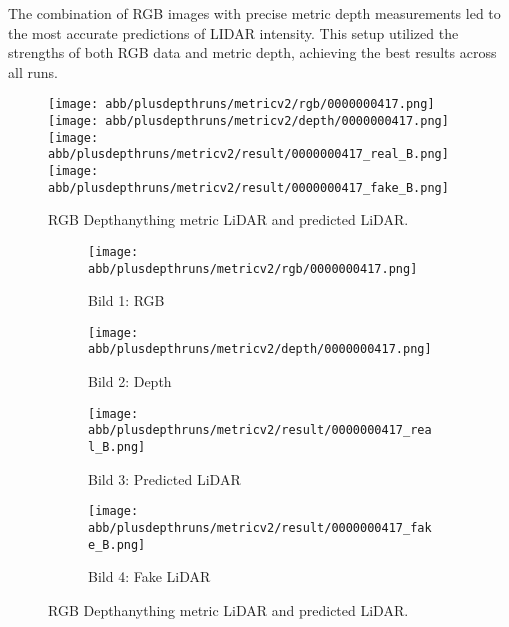 The combination of RGB images with precise metric depth measurements led to the most accurate predictions of LIDAR intensity. This setup utilized the strengths of both RGB data and metric depth, achieving the best results across all runs.
\begin{figure}[!ht]
	\centering
	\texttt{[image: abb/plusdepthruns/metricv2/rgb/0000000417.png]}
	\texttt{[image: abb/plusdepthruns/metricv2/depth/0000000417.png]}
	\texttt{[image: abb/plusdepthruns/metricv2/result/0000000417\_real\_B.png]}
	\texttt{[image: abb/plusdepthruns/metricv2/result/0000000417\_fake\_B.png]}
	\caption{RGB Depthanything metric LiDAR and predicted LiDAR.}
	\label{bpplusv2}
	
\end{figure}
\begin{figure}[!ht]
	\centering
	
	\begin{subfigure}{0.4\textwidth}
		\centering
		\texttt{[image: abb/plusdepthruns/metricv2/rgb/0000000417.png]}
		\caption{Bild 1: RGB}
		\label{fig:bild1}
	\end{subfigure}
	
	\vspace{1em} %
	
	\begin{subfigure}{0.4\textwidth}
		\centering
		\texttt{[image: abb/plusdepthruns/metricv2/depth/0000000417.png]}
		\caption{Bild 2: Depth}
		\label{fig:bild2}
	\end{subfigure}
	
	\vspace{1em} %
	
	\begin{subfigure}{0.25\textwidth}
		\centering
		\texttt{[image: abb/plusdepthruns/metricv2/result/0000000417\_real\_B.png]}
		\caption{Bild 3: Predicted LiDAR}
		\label{fig:bild3}
	\end{subfigure}
	\begin{subfigure}{0.25\textwidth}
		\centering
		\texttt{[image: abb/plusdepthruns/metricv2/result/0000000417\_fake\_B.png]}
		\caption{Bild 4: Fake LiDAR}
		\label{fig:bild4}
	\end{subfigure}
	
	\caption{RGB Depthanything metric LiDAR and predicted LiDAR.}
	\label{bpplusv2}
\end{figure}
